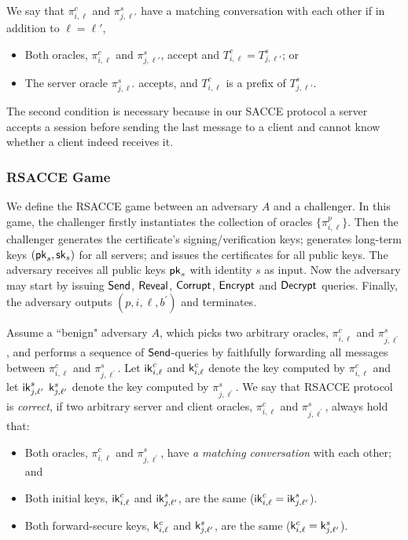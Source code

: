 \begin{definition}
 We say that $\pi^c_{i,\ell}$ and $\pi^s_{j,\ell'}$ have a matching conversation with each other if  in addition to $\ell=\ell'$,
 \begin{itemize}
  \item{Both oracles, $\pi^c_{i, \ell}$ and $\pi^s_{j,\ell'}$, accept and
  $T^c_{i,\ell} = T^s_{j,\ell'}$; or }
  \item{The server oracle $\pi^s_{j, \ell'}$ accepts,
  and $T^c_{i,\ell}$ is a prefix of $T^s_{j,\ell'}$.}
 \end{itemize}
\end{definition}
\begin{remark}
 The second condition is necessary because in our SACCE protocol
 a server accepts a session before sending the last message to a client
 and cannot know whether a client indeed receives it.
\end{remark}

\subsubsection{RSACCE Game}
We define the RSACCE game between an adversary $A$ and a challenger.
In this game, the challenger firstly instantiates the collection of oracles
$\{\pi^p_{i,\ell}\}$.
Then the challenger generates the certificate's signing/verification keys;
generates long-term keys $(\mathsf{pk}_s, \mathsf{sk}_s)$ for all servers;
and issues the certificates for all public keys.
The adversary receives all public keys $\mathsf{pk}_s$ with identity $s$ as input.
Now the adversary may start by issuing $\mathsf{Send}$, $\mathsf{Reveal}$, $\mathsf{Corrupt}$, $\mathsf{Encrypt}$ and $\mathsf{Decrypt}$ queries.
Finally, the adversary outputs $(p, i, \ell, b^{\prime})$ and terminates.

\begin{definition}[Correctness]
 Assume a ``benign" adversary $A$, which picks two arbitrary oracles, $\pi^c_{i, \ell}$ and $\pi^s_{j, \ell^{\prime}}$,
 and performs a sequence of $\mathsf{Send}$-queries by faithfully forwarding all messages
 between $\pi^c_{i, \ell}$ and $\pi^s_{j, \ell^{\prime}}$.
 Let $\mathsf{ik}^c_{i, \ell}$ and $\mathsf{k}^c_{i, \ell}$ denote the key computed by $\pi^c_{i, \ell}$
 and let $\mathsf{ik}^s_{j, \ell^{\prime}}$ $\mathsf{k}^s_{j, \ell^{\prime}}$ denote the key computed by $\pi^s_{j, \ell^{\prime}}$.
 We say that RSACCE protocol is \textit{correct}, if two arbitrary server and client oracles, $\pi^c_{i, \ell}$ and $\pi^s_{j, \ell^{\prime}}$, always hold that:
 \begin{itemize}
  \item{Both oracles, $\pi^c_{i, \ell}$ and $\pi^s_{j, \ell^{\prime}}$, have \textit{a matching conversation} with each other; and}
  \item{Both initial keys, $\mathsf{ik}^c_{i, \ell}$ and $\mathsf{ik}^s_{j, \ell^{\prime}}$, are the same ($\mathsf{ik}^c_{i, \ell} = \mathsf{ik}^s_{j, \ell^{\prime}}$).}
  \item{Both forward-secure keys, $\mathsf{k}^c_{i, \ell}$ and $\mathsf{k}^s_{j, \ell^{\prime}}$, are the same ($\mathsf{k}^c_{i, \ell} = \mathsf{k}^s_{j, \ell^{\prime}}$).}
 \end{itemize}
\end{definition}

